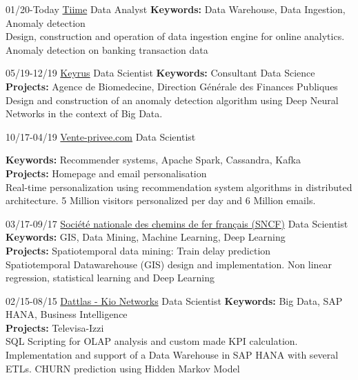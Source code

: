 \documentclass[]{friggeri-cv}
\begin{document}
\begin{entrylist}
\entry
{01/20-Today}
{\href{https://www.tiime.fr/}{Tiime}}
{Data Analyst} 
{\textbf{Keywords:} Data Warehouse, Data Ingestion, Anomaly detection \\
Design, construction and operation of data ingestion engine for online analytics. Anomaly detection on banking transaction data}

\entry
{05/19-12/19}
{\href{https://www.keyrus.com/}{Keyrus}}
{Data Scientist} 
{\textbf{Keywords:} Consultant Data Science\\
	\textbf{Projects:} Agence de Biomedecine, Direction Générale des Finances Publiques \\
Design and construction of an anomaly detection algorithm using Deep Neural Networks in the context of Big Data.
}
	
\entry
{10/17-04/19}
{\href{http://vente-privee.com}{Vente-privee.com}}
{Data Scientist} 
{\textbf{Keywords:} Recommender systems, Apache Spark, Cassandra, Kafka\\%
	\textbf{Projects:} Homepage and email personalisation  \\
	Real-time personalization using recommendation system algorithms in distributed architecture. 5 Million visitors personalized per day and 6 Million emails. %
	
}	
	
\entry
{03/17-09/17}
{\href{http://www.sncf.com/}{Société nationale des chemins de fer français (SNCF)}}
{Data Scientist} 
{\textbf{Keywords:} GIS, Data Mining, Machine Learning, Deep Learning\\
	\textbf{Projects:} Spatiotemporal data mining: Train delay prediction \\
	Spatiotemporal Datawarehouse (GIS) design and implementation. 
	Non linear regression, statistical learning and Deep Learning }
	
\entry
{02/15-08/15}
{\href{http://www.dattlas.com}{Dattlas - Kio Networks}}
{Data Scientist} 
{\textbf{Keywords:} Big Data, SAP HANA, Business Intelligence\\
\textbf{Projects:} Televisa-Izzi \\
SQL Scripting for OLAP analysis and custom made KPI calculation.
Implementation and support of a Data Warehouse in SAP HANA with several ETLs.
CHURN prediction using Hidden Markov Model}


\end{entrylist}
\end{document}

